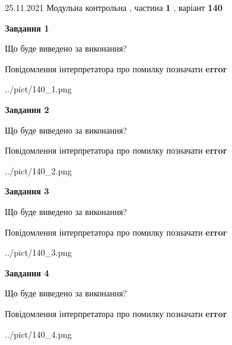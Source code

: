 \documentclass[10pt, ukrainian]{article}
\begin{document}
{25.11.2021 Модульна контрольна , частина \textbf { 1 }, варіант  \No \textbf { 140 }\par}
{
\begin {large}

{\begin {center}\textbf{Завдання 1}\end {center}}\par
Що буде виведено за виконання? \par
Повідомлення інтерпретатора про помилку позначати \textbf{error}

\begin{center}
	{../pict/140_1.png}
\end{center}
\newpage

{\begin {center}\textbf{Завдання 2}\end {center}}\par
Що буде виведено за виконання? \par
Повідомлення інтерпретатора про помилку позначати \textbf{error}

\begin{center}
	{../pict/140_2.png}
\end{center}
\newpage

{\begin {center}\textbf{Завдання 3}\end {center}}\par
Що буде виведено за виконання? \par
Повідомлення інтерпретатора про помилку позначати \textbf{error}

\begin{center}
	{../pict/140_3.png}
\end{center}
\newpage

{\begin {center}\textbf{Завдання 4}\end {center}}\par
Що буде виведено за виконання? \par
Повідомлення інтерпретатора про помилку позначати \textbf{error}

\begin{center}
	{../pict/140_4.png}
\end{center}
\newpage


\end{large}}
\end{document}
